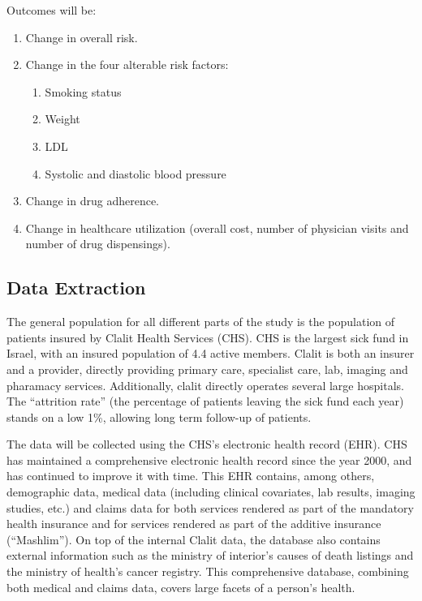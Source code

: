 \documentclass[a4paper,12pt]{article}
\begin{document}
		Outcomes will be:
		\begin{enumerate}
			\item Change in overall risk.
			\item Change in the four alterable risk factors:
			\begin{enumerate}
				\item Smoking status
				\item Weight
				\item LDL
				\item Systolic and diastolic blood pressure
			\end{enumerate}
			\item Change in drug adherence.
			\item Change in healthcare utilization (overall cost, number of physician visits and number of drug dispensings).
		\end{enumerate}
	
	\subsection{Data Extraction}
	The general population for all different parts of the study is the population of patients insured by Clalit Health Services (CHS). CHS is the largest sick fund in Israel, with an insured population of 4.4 active members. Clalit is both an insurer and a provider, directly providing primary care, specialist care, lab, imaging and pharamacy services. Additionally, clalit directly operates several large hospitals. The “attrition rate” (the percentage of patients leaving the sick fund each year) stands on a low 1\%, allowing long term follow-up of patients.
	
	The data will be collected using the CHS's electronic health record (EHR). CHS has maintained a comprehensive electronic health record since the year 2000, and has continued to improve it with time. This EHR contains, among others, demographic data, medical data (including clinical covariates, lab results, imaging studies, etc.) and claims data for both services rendered as part of the mandatory health insurance and for services rendered as part of the additive insurance (“Mashlim”). On top of the internal Clalit data, the database also contains external information such as the ministry of interior's causes of death listings and the ministry of health's cancer registry. This comprehensive database, combining both medical and claims data, covers large facets of a person's health.
	
\end{document}
